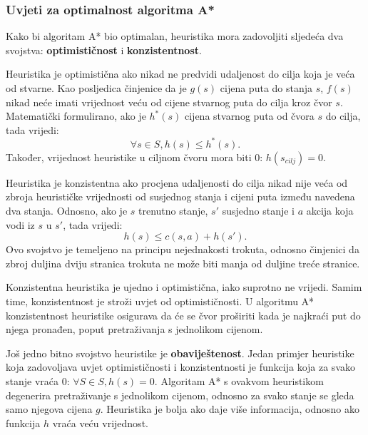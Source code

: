 \documentclass[times, utf8, zavrsni, numeric]{fer}
\begin{document}

\subsubsection{Uvjeti za optimalnost algoritma A*}
Kako bi algoritam A* bio optimalan, heuristika mora zadovoljiti sljedeća dva svojstva: \textbf{optimističnost} i \textbf{konzistentnost}.

\par Heuristika je optimistična ako nikad ne predvidi udaljenost do cilja koja je veća od stvarne. 
Kao posljedica činjenice da je \(g(s)\) cijena puta do stanja \(s\), \(f(s)\) nikad neće imati vrijednost veću od cijene stvarnog puta do cilja kroz čvor \(s\).
Matematički formulirano, ako je \(h^*(s)\) cijena stvarnog puta od čvora \(s\) do cilja, tada vrijedi:
\[\forall s \in S, h(s) \leq h^*(s).\]
Također, vrijednost heuristike u ciljnom čvoru mora biti 0: \(h(s_{cilj}) = 0\).

\par Heuristika je konzistentna ako procjena udaljenosti do cilja nikad nije veća  od zbroja heurističke vrijednosti od susjednog stanja i cijeni puta između navedena dva stanja.
Odnosno, ako je \(s\) trenutno stanje, \(s'\) susjedno stanje i \(a\) akcija koja vodi iz \(s\) u \(s'\), tada vrijedi:
\[h(s) \leq c(s, a) + h(s').\]
Ovo svojstvo je temeljeno na principu nejednakosti trokuta, odnosno činjenici da zbroj duljina dviju stranica trokuta ne može biti manja od duljine treće stranice.


\par Konzistentna heuristika je ujedno i optimistična, iako suprotno ne vrijedi. 
Samim time, konzistentnost je stroži uvjet od optimističnosti. 
U algoritmu A* konzistentnost heuristike osigurava da će se čvor proširiti kada je najkraći put do njega pronađen, poput pretraživanja s jednolikom cijenom.

\par Još jedno bitno svojstvo heuristike je \textbf{obaviještenost}. 
Jedan primjer heuristike koja zadovoljava uvjet optimističnosti i konzistentnosti je funkcija koja za svako stanje vraća 0: \(\forall S \in S, h(s) = 0\). 
Algoritam A* s ovakvom heuristikom degenerira pretraživanje s jednolikom cijenom, odnosno za svako stanje se gleda samo njegova cijena \(g\). 
Heuristika je bolja ako daje više informacija, odnosno ako funkcija \(h\) vraća veću vrijednost.

\end{document}
